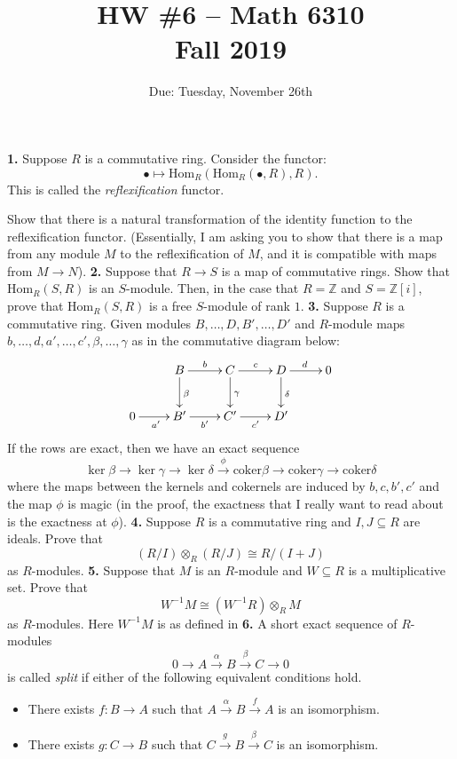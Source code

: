 \documentclass[11pt]{amsart}
\renewcommand{\to}[1][]{\xrightarrow{\ #1\ }}
\newcommand{\bZ}{\mathbb{Z}}
\newcommand{\Hom}{\mathrm{Hom}}
\newcommand{\coker}{\mathrm{coker}}
\begin{document}
\title{HW \#6 -- Math 6310\\Fall 2019}
\author{Due: Tuesday, November 26th}
\maketitle
\noindent
{\bf 1.}  Suppose $R$ is a commutative ring.  Consider the functor:
\[
    \bullet \mapsto \Hom_R(\Hom_R(\bullet, R), R).
\]
This is called the \emph{reflexification} functor.  

Show that there is a natural transformation of the identity function to the reflexification functor.  (Essentially, I am asking you to show that there is a map from any module $M$ to the reflexification of $M$, and it is compatible with maps from $M \to N$).
\newpage
\noindent
{\bf 2.}  Suppose that $R \to S$ is a map of commutative rings.  Show that $\Hom_R(S, R)$ is an $S$-module.  Then, in the case that $R = \bZ$ and $S = \bZ[i]$, prove that $\Hom_R(S, R)$ is a free $S$-module of rank $1$.  
\newpage
\noindent
{\bf 3.}  Suppose $R$ is a commutative ring.  Given modules $B, \ldots, D, B', \ldots, D'$ and $R$-module maps $b, \ldots, d, a', \ldots, c', \beta, \ldots, \gamma$ as in the commutative diagram below:
\[
\xymatrix{
&  B \ar[r]^b \ar[d]^{\beta} &  C  \ar[r]^c \ar[d]^{\gamma} & D  \ar[d]^{\delta} \ar[r]^d & 0 \\
0 \ar[r]_{a'}        & B' \ar[r]_{b'} & C' \ar[r]_{c'} & D' & \\
}
\]
If the rows are exact, then we have an exact sequence
\[
\ker \beta \to \ker \gamma \to \ker \delta \xrightarrow{\phi} \coker \beta \to \coker \gamma \to \coker \delta
\]
where the maps between the kernels and cokernels are induced by $b,c,b',c'$ and the map $\phi$ is magic (in the proof, the exactness that I really want to read about is the exactness at $\phi$).
\newpage
\noindent
{\bf 4.}  Suppose $R$ is a commutative ring and $I, J \subseteq R$ are ideals.  Prove that
\[
    (R/I) \otimes_R (R/J) \cong R/(I + J)
\]
as $R$-modules.
\newpage
\noindent
{\bf 5.}  Suppose that $M$ is an $R$-module and $W \subseteq R$ is a multiplicative set.  Prove that
\[
    W^{-1} M \cong (W^{-1}R) \otimes_R M
\]
as $R$-modules.  Here $W^{-1} M$ is as defined in 
\newpage
\noindent
{\bf 6.}  A short exact sequence of $R$-modules
\[
    0 \to A \xrightarrow{\alpha} B \xrightarrow{\beta} C \to 0
\]
is called \emph{split} if either of the following equivalent conditions hold.
\begin{itemize}
    \item[(a)]  There exists $f : B \to A$ such that $A \xrightarrow{\alpha} B \xrightarrow{f} A$ is an isomorphism.
    \item[(b)]  There exists $g : C \to B$ such that $C \xrightarrow{g} B \xrightarrow{\beta} C$ is an isomorphism.    
\end{itemize}
\end{document}
